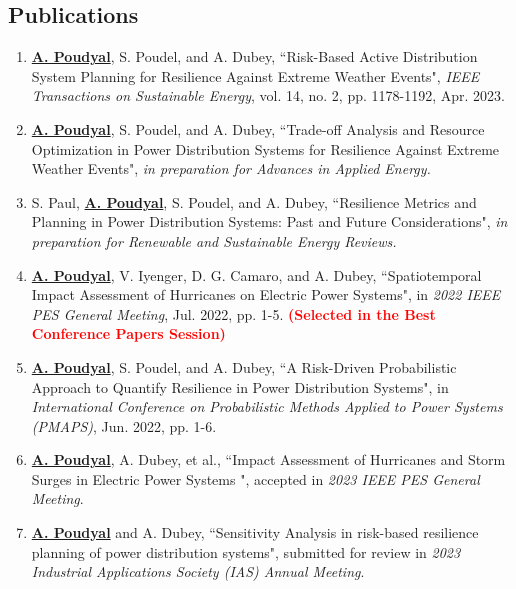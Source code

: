 \documentclass[hidelinks, 12pt]{article}
\begin{document}
\subsection{Publications}
\small
\begin{enumerate}
    \item {\textbf{\underline{A. Poudyal}}, S. Poudel, and A. Dubey, ``Risk-Based Active Distribution System Planning for Resilience Against Extreme Weather Events", \textit{IEEE Transactions on Sustainable Energy}, vol. 14, no. 2, pp. 1178-1192, Apr. 2023.}
    \item \textbf{\underline{A. Poudyal}}, S. Poudel, and A. Dubey, ``Trade-off Analysis and Resource Optimization in Power Distribution Systems for Resilience Against Extreme Weather Events", \textit{in preparation for Advances in Applied Energy.}
    \item S. Paul, \textbf{\underline{A. Poudyal}}, S. Poudel, and A. Dubey, ``Resilience Metrics and Planning in Power Distribution Systems: Past and Future Considerations", \textit{in preparation for Renewable and Sustainable Energy Reviews.}
    \item {\textbf{\underline{A. Poudyal}}, V. Iyenger, D. G. Camaro, and A. Dubey, ``Spatiotemporal Impact Assessment of Hurricanes on Electric Power Systems", in \textit{2022 IEEE PES General Meeting}, Jul. 2022, pp. 1-5. \textcolor{red}{\textbf{(Selected in the Best Conference Papers Session)}}}
    
    \item {\textbf{\underline{A. Poudyal}}, S. Poudel, and A. Dubey, ``A Risk-Driven Probabilistic Approach to Quantify Resilience in Power Distribution Systems", in \textit{International Conference on Probabilistic Methods Applied to Power Systems (PMAPS)}, Jun. 2022, pp. 1-6.}
    
    \item \textbf{\underline{A. Poudyal}}, A. Dubey, et al., ``Impact Assessment of Hurricanes and Storm Surges in Electric Power Systems ", accepted in \textit{2023 IEEE PES General Meeting}.
    
    \item {\textbf{\underline{A. Poudyal}} and A. Dubey, ``Sensitivity Analysis in risk-based resilience planning of power distribution systems", submitted for review in \textit{2023 Industrial Applications Society (IAS) Annual Meeting}.}
    
    
    
\end{enumerate}
\end{document}
